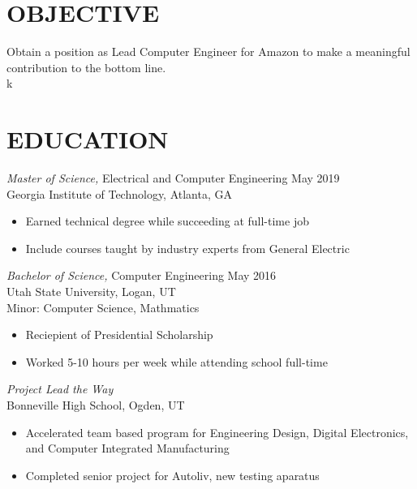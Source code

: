 \documentclass[line,margin]{res}
\begin{document}
\address{sam.tanner@aggiemail.usu.edu}
\address{(208) 830-1983}


\begin{resume}

	\section{OBJECTIVE}
	Obtain a position as Lead Computer Engineer for Amazon to make a meaningful contribution
	to the bottom line.\\
	k

	\section{EDUCATION}
	 {\sl Master of Science,} Electrical and Computer Engineering \hfill May 2019\\
	Georgia Institute of Technology, Atlanta, GA
	\begin{itemize} \itemsep -2pt %
		\item Earned technical degree while succeeding at full-time job
		\item Include courses taught by industry experts from General Electric
	\end{itemize}


	{\sl Bachelor of Science,} Computer Engineering \hfill May 2016\\
	Utah State University, Logan, UT\\
	Minor: Computer Science, Mathmatics
	\begin{itemize} \itemsep -2pt %
		\item Reciepient of Presidential Scholarship
		\item Worked 5-10 hours per week while attending school full-time
	\end{itemize}

	{\sl Project Lead the Way}\\
	Bonneville High School, Ogden, UT
	\begin{itemize} \itemsep -2pt
		\item Accelerated team based program for Engineering Design, Digital Electronics,
		      and Computer Integrated Manufacturing
		\item Completed senior project for Autoliv, new testing aparatus
	\end{itemize}


\end{resume}
\end{document}
